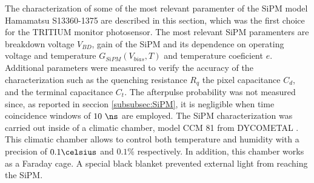 The characterization of some of the most relevant paramenter of the SiPM model Hamamatsu S13360-1375 are described in this section, which was the first choice for the TRITIUM monitor photosensor. The most relevant SiPM paramenters are breakdown voltage $V_{BD}$, gain of the SiPM and its dependence on operating voltage and temperature $G_{SiPM}(V_{bias}, T)$ and temperature coeficient $e$. Additional parameters were measured to verify the accuracy of the characterization such as the quenching resistance $R_q$ the pixel capacitance $C_d$, and the terminal capacitance $C_t$. The afterpulse probability was not measured since, as reported in seccion \ref{subsubsec:SiPM}, it is negligible when time coincidence windows of $10~\ns$ are employed. The SiPM characterization was carried out inside of a climatic chamber, model CCM 81 from DYCOMETAL \cite{ClimaticChamberIFIMED}. This climatic chamber allows to control both temperature and humidity with a precision of $0.1\celsius$ and $0.1\%$ respectively. In addition, this chamber works as a Faraday cage. A special black blanket \cite{BlackBlancket} prevented external light from reaching the SiPM. 

